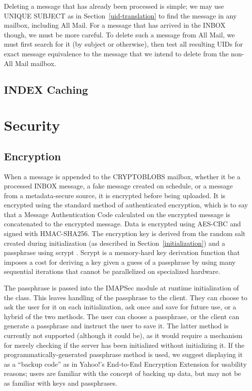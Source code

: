 \documentclass[pageno]{jpaper}
\newcommand{\project}{IMAPSec }
\begin{document}
Deleting a message that has already been processed is simple; we may use UNIQUE SUBJECT as in Section~\ref{uid-translation} to find the message in any mailbox, including All Mail. For a message that has arrived in the INBOX though, we must be more careful. To delete such a message from All Mail, we must first search for it (by subject or otherwise), then test all resulting UIDs for exact message equivalence to the message that we intend to delete from the non-All Mail mailbox.

\subsection{INDEX Caching}

\section{Security}

\label{encryption}
\subsection{Encryption}

When a message is appended to the CRYPTOBLOBS mailbox, whether it be a processed INBOX message, a fake message created on schedule, or a message from a metadata-secure source, it is encrypted before being uploaded. It is encrypted using the standard method of authenticated encryption, which is to say that a Message Authentication Code calculated on the encrypted message is concatenated to the encrypted message. Data is encrypted using AES-CBC and signed with HMAC-SHA256. The encryption key is derived from the random salt created during initialization (as described in Section~\ref{initialization}) and a passphrase using scrypt \cite{percival2009stronger}. Scrypt is a memory-hard key derivation function that imposes a cost for deriving a key given a guess of a passphrase by using many sequential iterations that cannot be parallelized on specialized hardware.

The passphrase is passed into the \project module at runtime initialization of the class. This leaves handling of the passphrase to the client. They can choose to ask the user for it on each initialization, ask once and save for future use, or a hybrid of the two methods. The user can choose a passphrase, or the client can generate a passphrase and instruct the user to save it. The latter method is currently not supported (although it could be), as it would require a mechanism for merely checking if the server has been initialized without initializing it. If the programmatically-generated passphrase method is used, we suggest displaying it as a ``backup code'' as in Yahoo!'s End-to-End Encryption Extension \cite{yahoo} for usability reasons; users are familiar with the concept of backing up data, but may not be as familiar with keys and passphrases.
\end{document}

